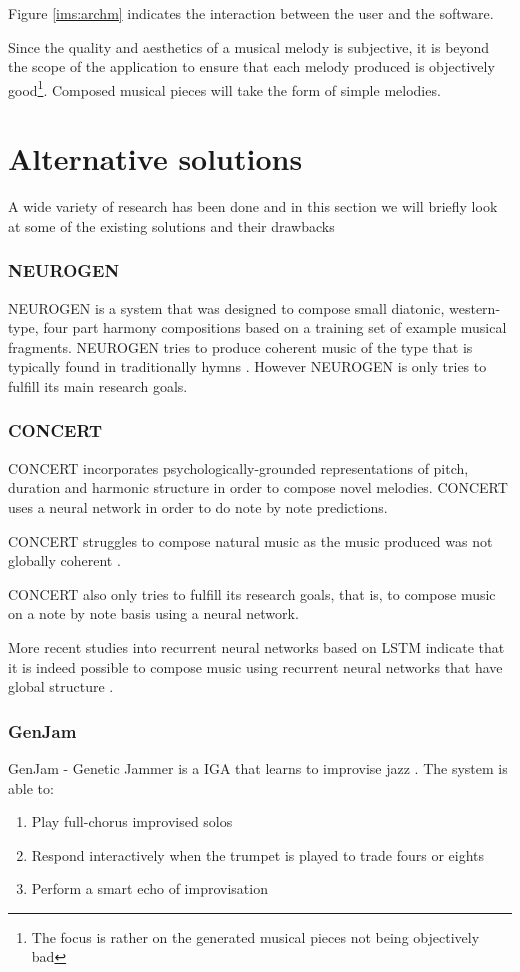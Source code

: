 Figure \ref{ims:archm} indicates the interaction between the user and the software.

Since the quality and aesthetics of a musical melody is subjective, it is beyond the scope of the application to ensure that each melody produced is objectively good\footnote{The focus is rather on the generated musical pieces not being objectively bad}. Composed musical pieces will take the form of simple melodies.

\section{Alternative solutions}
A wide variety of research has been done and in this section we will briefly look at some of the existing solutions and their drawbacks

\subsubsection{NEUROGEN}
NEUROGEN is a system that was designed to compose small diatonic, western-type, four part harmony compositions based on a training set of example musical fragments. NEUROGEN tries to produce coherent music of the type that is typically found in traditionally hymns \cite{gibson1991neurogen}.
However NEUROGEN is only tries to fulfill its main research goals.

\subsubsection{CONCERT}
CONCERT incorporates psychologically-grounded representations of pitch, duration and harmonic structure in order to compose novel melodies. CONCERT uses a neural network in order to do note by note predictions. 

CONCERT struggles to compose natural music as the music produced was not globally coherent \cite{mozer1994neural}. 

CONCERT also only tries to fulfill its research goals, that is, to compose music on a note by note basis using a neural network.

More recent studies into recurrent neural networks based on \ac{LSTM} indicate that it is indeed possible to compose music using recurrent neural networks that have global structure \cite{Eck2002}.

\subsubsection{GenJam}
GenJam - Genetic Jammer is a \acs{IGA} that learns to improvise jazz \cite{Biles1994}.
The system is able to: 
\begin{enumerate}
\item Play full-chorus improvised solos
\item Respond interactively when the trumpet is played to trade fours or eights
\item Perform a smart echo of improvisation
\end{enumerate}

